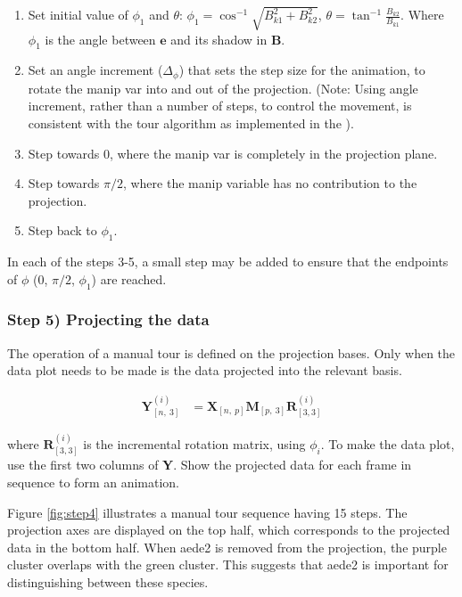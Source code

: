 \begin{enumerate}
\def\labelenumi{\arabic{enumi}.}
\tightlist
\item
  Set initial value of \(\phi_1\) and \(\theta\):
  \(\phi_1 = \cos^{-1}{\sqrt{B_{k1}^2+B_{k2}^2}}\),
  \(\theta = \tan^{-1}\frac{B_{k2}}{B_{k1}}\). Where \(\phi_1\) is the
  angle between \(\textbf{e}\) and its shadow in \(\textbf{B}\).
\item
  Set an angle increment (\(\Delta_\phi\)) that sets the step size for
  the animation, to rotate the manip var into and out of the projection.
  (Note: Using angle increment, rather than a number of steps, to
  control the movement, is consistent with the tour algorithm as
  implemented in the ).
\item
  Step towards \(0\), where the manip var is completely in the
  projection plane.
\item
  Step towards \(\pi/2\), where the manip variable has no contribution
  to the projection.
\item
  Step back to \(\phi_1\).
\end{enumerate}

In each of the steps 3-5, a small step may be added to ensure that the
endpoints of \(\phi\) (\(0\), \(\pi/2\), \(\phi_1\)) are reached.

\hypertarget{sec:display}{%
\subsubsection{Step 5) Projecting the data}\label{sec:display}}

The operation of a manual tour is defined on the projection bases. Only
when the data plot needs to be made is the data projected into the
relevant basis.

\begin{align*}
  \textbf{Y}^{(i)}_{[n,~3]} &= \textbf{X}_{[n,~p]} \textbf{M}_{[p,~3]} \textbf{R}^{(i)}_{[3,3]}
\end{align*}

\noindent where \(\textbf{R}^{(i)}_{[3,3]}\) is the incremental rotation
matrix, using \(\phi_i\). To make the data plot, use the first two
columns of \textbf{Y}. Show the projected data for each frame in
sequence to form an animation.

Figure \ref{fig:step4} illustrates a manual tour sequence having 15
steps. The projection axes are displayed on the top half, which
corresponds to the projected data in the bottom half. When aede2 is
removed from the projection, the purple cluster overlaps with the green
cluster. This suggests that aede2 is important for distinguishing
between these species.

